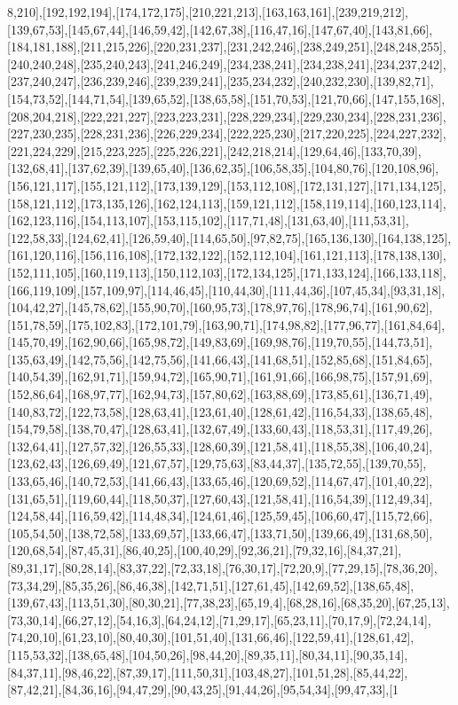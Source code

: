 8,210],[192,192,194],[174,172,175],[210,221,213],[163,163,161],[239,219,212],[139,67,53],[145,67,44],[146,59,42],[142,67,38],[116,47,16],[147,67,40],[143,81,66],[184,181,188],[211,215,226],[220,231,237],[231,242,246],[238,249,251],[248,248,255],[240,240,248],[235,240,243],[241,246,249],[234,238,241],[234,238,241],[234,237,242],[237,240,247],[236,239,246],[239,239,241],[235,234,232],[240,232,230],[139,82,71],[154,73,52],[144,71,54],[139,65,52],[138,65,58],[151,70,53],[121,70,66],[147,155,168],[208,204,218],[222,221,227],[223,223,231],[228,229,234],[229,230,234],[228,231,236],[227,230,235],[228,231,236],[226,229,234],[222,225,230],[217,220,225],[224,227,232],[221,224,229],[215,223,225],[225,226,221],[242,218,214],[129,64,46],[133,70,39],[132,68,41],[137,62,39],[139,65,40],[136,62,35],[106,58,35],[104,80,76],[120,108,96],[156,121,117],[155,121,112],[173,139,129],[153,112,108],[172,131,127],[171,134,125],[158,121,112],[173,135,126],[162,124,113],[159,121,112],[158,119,114],[160,123,114],[162,123,116],[154,113,107],[153,115,102],[117,71,48],[131,63,40],[111,53,31],[122,58,33],[124,62,41],[126,59,40],[114,65,50],[97,82,75],[165,136,130],[164,138,125],[161,120,116],[156,116,108],[172,132,122],[152,112,104],[161,121,113],[178,138,130],[152,111,105],[160,119,113],[150,112,103],[172,134,125],[171,133,124],[166,133,118],[166,119,109],[157,109,97],[114,46,45],[110,44,30],[111,44,36],[107,45,34],[93,31,18],[104,42,27],[145,78,62],[155,90,70],[160,95,73],[178,97,76],[178,96,74],[161,90,62],[151,78,59],[175,102,83],[172,101,79],[163,90,71],[174,98,82],[177,96,77],[161,84,64],[145,70,49],[162,90,66],[165,98,72],[149,83,69],[169,98,76],[119,70,55],[144,73,51],[135,63,49],[142,75,56],[142,75,56],[141,66,43],[141,68,51],[152,85,68],[151,84,65],[140,54,39],[162,91,71],[159,94,72],[165,90,71],[161,91,66],[166,98,75],[157,91,69],[152,86,64],[168,97,77],[162,94,73],[157,80,62],[163,88,69],[173,85,61],[136,71,49],[140,83,72],[122,73,58],[128,63,41],[123,61,40],[128,61,42],[116,54,33],[138,65,48],[154,79,58],[138,70,47],[128,63,41],[132,67,49],[133,60,43],[118,53,31],[117,49,26],[132,64,41],[127,57,32],[126,55,33],[128,60,39],[121,58,41],[118,55,38],[106,40,24],[123,62,43],[126,69,49],[121,67,57],[129,75,63],[83,44,37],[135,72,55],[139,70,55],[133,65,46],[140,72,53],[141,66,43],[133,65,46],[120,69,52],[114,67,47],[101,40,22],[131,65,51],[119,60,44],[118,50,37],[127,60,43],[121,58,41],[116,54,39],[112,49,34],[124,58,44],[116,59,42],[114,48,34],[124,61,46],[125,59,45],[106,60,47],[115,72,66],[105,54,50],[138,72,58],[133,69,57],[133,66,47],[133,71,50],[139,66,49],[131,68,50],[120,68,54],[87,45,31],[86,40,25],[100,40,29],[92,36,21],[79,32,16],[84,37,21],[89,31,17],[80,28,14],[83,37,22],[72,33,18],[76,30,17],[72,20,9],[77,29,15],[78,36,20],[73,34,29],[85,35,26],[86,46,38],[142,71,51],[127,61,45],[142,69,52],[138,65,48],[139,67,43],[113,51,30],[80,30,21],[77,38,23],[65,19,4],[68,28,16],[68,35,20],[67,25,13],[73,30,14],[66,27,12],[54,16,3],[64,24,12],[71,29,17],[65,23,11],[70,17,9],[72,24,14],[74,20,10],[61,23,10],[80,40,30],[101,51,40],[131,66,46],[122,59,41],[128,61,42],[115,53,32],[138,65,48],[104,50,26],[98,44,20],[89,35,11],[80,34,11],[90,35,14],[84,37,11],[98,46,22],[87,39,17],[111,50,31],[103,48,27],[101,51,28],[85,44,22],[87,42,21],[84,36,16],[94,47,29],[90,43,25],[91,44,26],[95,54,34],[99,47,33],[1